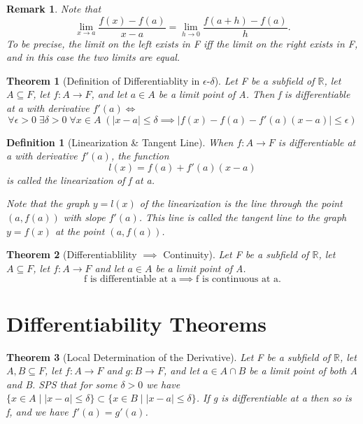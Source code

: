 \documentclass[11pt, oneside]{book}
\theoremstyle{break}
\newtheorem{thm}{Theorem}[section]
\newtheorem*{remark}{Remark}
\newtheorem{defn}{Definition}[section]
\newcommand{\bb}[1]{\mathbb{#1}}		%
\begin{document}
\begin{remark}
	Note that
	\[
		\lim_{x \to a} \frac{f(x) - f(a)}{x - a} = \lim_{h \to 0} \frac{f(a + h) - f(a)}{h}.
	\]
	To be precise, the limit on the left exists in F iff the limit on the right exists in F, and in this case the two limits are equal.
\end{remark}

\begin{thm}[Definition of Differentiablity in $\epsilon$-$\delta$]
	Let F be a subfield of $\bb{R}$, let $A \subseteq F$, let $f: A \to F$, and let $a \in A$ be a limit point of A. Then f is differentiable at a with derivative $f'(a) \iff$
	\[
		\forall \epsilon > 0 \; \exists \delta > 0 \; \forall x \in A \; (|x - a| \leq \delta \implies |f(x) - f(a) - f'(a)(x-a)| \leq \epsilon)
	\]
\end{thm}

\begin{defn}[Linearization \& Tangent Line]
	When $f: A \to F$ is differentiable at a with derivative $f'(a)$, the function
	\[
		l(x) = f(a) + f'(a)(x-a)
	\]
	is called the linearization of f at a.

	Note that the graph $y = l(x)$ of the linearization is the line through the point $(a, f(a))$ with slope $f'(a)$. This line is called the tangent line to the graph $y = f(x)$ at the point $(a, f(a))$.
\end{defn}

\begin{thm}[Differentiablility $\implies$ Continuity]
	Let F be a subfield of $\bb{R}$, let $A \subseteq F$, let $f: A \to F$ and let $a \in A$ be a limit point of A.
	\[
		\text{f is differentiable at a} \implies \text{f is continuous at a}.
	\]
\end{thm}


\section{Differentiability Theorems}

\begin{thm}[Local Determination of the Derivative]
	Let F be a subfield of $\bb{R}$, let $A, B \subseteq F$, let $f: A \to F$ and $g:B \to F$, and let $a \in A \cap B$ be a limit point of both A and B. SPS that for some $\delta > 0$ we have $\{ x \in A \; | \; |x - a| \leq \delta \} \subset \{x \in B \; | \; |x - a| \leq \delta\}$. If g is differentiable at a then so is f, and we have $f'(a) = g'(a)$.
\end{thm}
\end{document}
